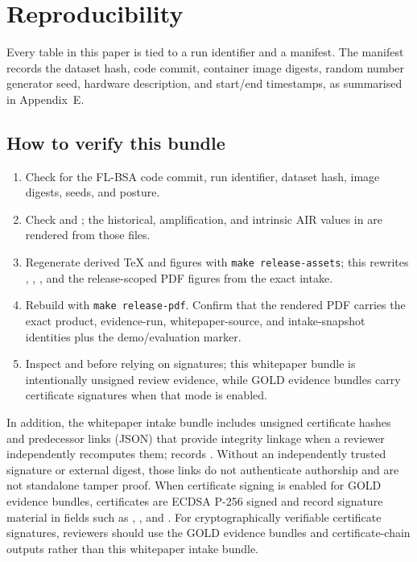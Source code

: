 
\section{Reproducibility}
Every table in this paper is tied to a run identifier and a manifest. The manifest records the dataset hash, code commit, container image digests, random number generator seed, hardware description, and start/end timestamps, as summarised in Appendix~E.

\subsection{How to verify this bundle}
\begin{enumerate}[leftmargin=*]
\item Check  for the FL-BSA code commit, run identifier, dataset hash, image digests, seeds, and  posture.
\item Check  and ; the historical, amplification, and intrinsic AIR values in  are rendered from those files.
\item Regenerate derived TeX and figures with \texttt{make release-assets}; this rewrites , , , and the release-scoped PDF figures from the exact intake.
\item Rebuild with \texttt{make release-pdf}. Confirm that the rendered PDF carries the exact product, evidence-run, whitepaper-source, and intake-snapshot identities plus the demo/evaluation marker.
\item Inspect  and  before relying on signatures; this whitepaper bundle is intentionally unsigned review evidence, while GOLD evidence bundles carry certificate signatures when that mode is enabled.
\end{enumerate}

In addition, the whitepaper intake bundle includes unsigned certificate hashes and predecessor links (JSON) that provide integrity linkage when a reviewer independently recomputes them;  records . Without an independently trusted signature or external digest, those links do not authenticate authorship and are not standalone tamper proof. When certificate signing is enabled for GOLD evidence bundles, certificates are ECDSA P-256 signed and record signature material in fields such as , , and . For cryptographically verifiable certificate signatures, reviewers should use the GOLD evidence bundles and certificate-chain outputs rather than this whitepaper intake bundle.
